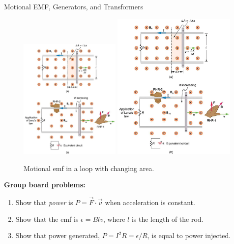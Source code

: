 \documentclass{beamer}
\begin{document}
\begin{frame}{Motional EMF, Generators, and Transformers}
\small
\begin{figure}
\centering
\includegraphics[width=0.44\textwidth,trim=4cm 20cm 4cm 0cm,clip=true]{figures/motion_emf.png}
\includegraphics[width=0.54\textwidth,trim=0cm 0cm 0cm 18cm,clip=true]{figures/motion_emf.png}
\caption{\label{fig:motion_emf1} Motional emf in a loop with changing area.}
\end{figure}
\footnotesize
\textbf{\alert{Group board problems:}}
\begin{enumerate}
\item Show that \textit{power} is $P = \vec{F} \cdot \vec{v}$ when acceleration is constant.
\item Show that the emf is $\epsilon = B l v$, where $l$ is the length of the rod.
\item Show that power generated, $P = I^2 R = \epsilon/R$, is equal to power injected.
\end{enumerate}
\end{frame}
\end{document}

